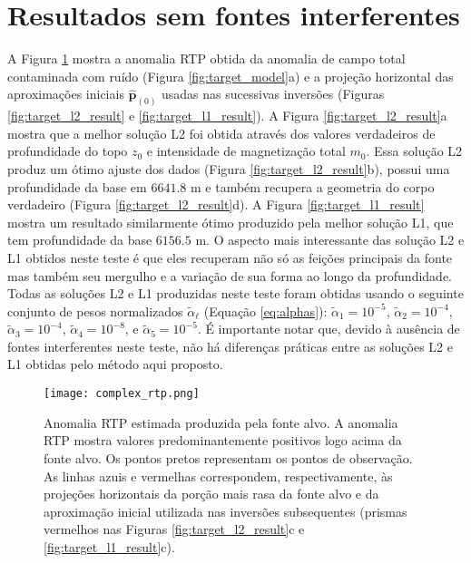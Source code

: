 \section{Resultados sem fontes interferentes}
\label{sec:target_source_without_interference}


A Figura \ref{fig:target_model_rtp} mostra a anomalia RTP obtida da anomalia de campo total contaminada com ruído (Figura \ref{fig:target_model}a) e 
a projeção horizontal das aproximações iniciais $\hat{\mathbf{p}}_{(0)}$ 
usadas nas sucessivas inversões (Figuras \ref{fig:target_l2_result} e 
\ref{fig:target_l1_result}).
A Figura \ref{fig:target_l2_result}a mostra que a melhor solução L2 foi obtida através dos valores verdadeiros de profundidade do topo $z_{0}$ e intensidade de magnetização total $m_{0}$. Essa solução L2 produz um ótimo ajuste dos dados (Figura \ref{fig:target_l2_result}b), possui uma profundidade da base em $6641.8$ m e também recupera a geometria do corpo verdadeiro (Figura \ref{fig:target_l2_result}d).
A Figura \ref{fig:target_l1_result} mostra um resultado similarmente ótimo produzido pela melhor solução L1, que tem profundidade da base $6156.5$ m.
O aspecto mais interessante das solução L2 e L1 obtidos neste teste é que eles recuperam não só as feições principais da fonte mas também seu mergulho e a variação de sua forma ao longo da profundidade.
Todas as soluções L2 e L1 produzidas neste teste foram obtidas usando o seguinte conjunto de pesos normalizados $\tilde{\alpha}_{\ell}$ (Equação \ref{eq:alphas}): 
$\tilde{\alpha}_{1} = 10^{-5}$, $\tilde{\alpha}_{2} = 10^{-4}$, 
$\tilde{\alpha}_{3} = 10^{-4}$, $\tilde{\alpha}_{4} = 10^{-8}$, e 
$\tilde{\alpha}_{5} = 10^{-5}$. 
É importante notar que, devido à ausência de fontes interferentes neste teste, não há diferenças práticas entre as soluções L2 e L1 obtidas pelo método aqui proposto.

\begin{figure}[!htb]
	\centering
	\texttt{[image: complex\_rtp.png]}
	\caption{Anomalia RTP estimada produzida pela fonte alvo. 
		A anomalia RTP mostra valores predominantemente positivos logo acima da fonte alvo. Os pontos pretos representam os pontos de observação. As linhas azuis e vermelhas correspondem, respectivamente, às projeções horizontais da porção mais rasa da fonte alvo e da aproximação inicial utilizada nas inversões subsequentes (prismas vermelhos nas Figuras \ref{fig:target_l2_result}c e 
		\ref{fig:target_l1_result}c).
	}
	\label{fig:target_model_rtp}
\end{figure}

